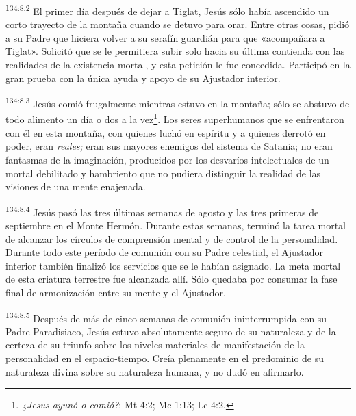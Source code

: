 \par
\textsuperscript{134:8.2} El primer día después de dejar a Tiglat, Jesús sólo había ascendido un corto trayecto de la montaña cuando se detuvo para orar. Entre otras cosas, pidió a su Padre que hiciera volver a su serafín guardián para que «acompañara a Tiglat». Solicitó que se le permitiera subir solo hacia su última contienda con las realidades de la existencia mortal, y esta petición le fue concedida. Participó en la gran prueba con la única ayuda y apoyo de su Ajustador interior.

\par
\textsuperscript{134:8.3} Jesús comió frugalmente mientras estuvo en la montaña; sólo se abstuvo de todo alimento un día o dos a la vez\footnote{\textit{¿Jesus ayunó o comió?}: Mt 4:2; Mc 1:13; Lc 4:2.}. Los seres superhumanos que se enfrentaron con él en esta montaña, con quienes luchó en espíritu y a quienes derrotó en poder, eran \textit{reales;} eran sus mayores enemigos del sistema de Satania; no eran fantasmas de la imaginación, producidos por los desvaríos intelectuales de un mortal debilitado y hambriento que no pudiera distinguir la realidad de las visiones de una mente enajenada.

\par
\textsuperscript{134:8.4} Jesús pasó las tres últimas semanas de agosto y las tres primeras de septiembre en el Monte Hermón. Durante estas semanas, terminó la tarea mortal de alcanzar los círculos de comprensión mental y de control de la personalidad. Durante todo este período de comunión con su Padre celestial, el Ajustador interior también finalizó los servicios que se le habían asignado. La meta mortal de esta criatura terrestre fue alcanzada allí. Sólo quedaba por consumar la fase final de armonización entre su mente y el Ajustador.

\par
\textsuperscript{134:8.5} Después de más de cinco semanas de comunión ininterrumpida con su Padre Paradisiaco, Jesús estuvo absolutamente seguro de su naturaleza y de la certeza de su triunfo sobre los niveles materiales de manifestación de la personalidad en el espacio-tiempo. Creía plenamente en el predominio de su naturaleza divina sobre su naturaleza humana, y no dudó en afirmarlo.

